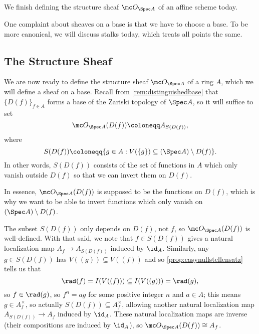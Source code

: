 \documentclass[../notes.tex]{subfiles}
\begin{document}
We finish defining the structure sheaf $\mc O_{\Spec A}$ of an affine scheme today.
\begin{remark}
	One complaint about sheaves on a base is that we have to choose a base. To be more canonical, we will discuss stalks today, which treats all points the same.
\end{remark}

\subsection{The Structure Sheaf}
We are now ready to define the structure sheaf $\mc O_{\Spec A}$ of a ring $A$, which we will define a sheaf on a base. Recall from \autoref{rem:distinguishedbase} that $\{D(f)\}_{f\in A}$ forms a base of the Zariski topology of $\Spec A$, so it will suffice to set
\[\mc O_{\Spec A}(D(f))\coloneqq A_{S(D(f))},\]
where
\[S(D(f))\coloneqq\{g\in A:V(\{g\})\subseteq(\Spec A)\setminus D(f)\}.\]
In other words, $S(D(f))$ consists of the set of functions in $A$ which only vanish outside $D(f)$ so that we can invert them on $D(f)$.
\begin{remark}
	In essence, $\mc O_{\Spec A}(D(f))$ is supposed to be the functions on $D(f)$, which is why we want to be able to invert functions which only vanish on $(\Spec A)\setminus D(f)$.
\end{remark}
\begin{remark}
	The subset $S(D(f))$ only depends on $D(f)$, not $f$, so $\mc O_{\Spec A}(D(f))$ is well-defined. With that said, we note that $f\in S(D(f))$ gives a natural localization map $A_f\to A_{S(D(f))}$ induced by $\id_A$. Similarly, any $g\in S(D(f))$ has $V((g))\subseteq V((f))$ and so \autoref{prop:easynullstellensatz} tells us that
	\[\rad(f)=I(V((f)))\subseteq I(V((g)))=\rad(g),\]
	so $f\in\rad(g)$, so $f^n=ag$ for some positive integer $n$ and $a\in A$; this means $g\in A_f^\times$, so actually $S(D(f))\subseteq A_f^\times$, allowing another natural localization map $A_{S(D(f))}\to A_f$ induced by $\id_A$. These natural localization maps are inverse (their compositions are induced by $\id_A$), so $\mc O_{\Spec A}(D(f))\cong A_f$.
\end{remark}
\end{document}
